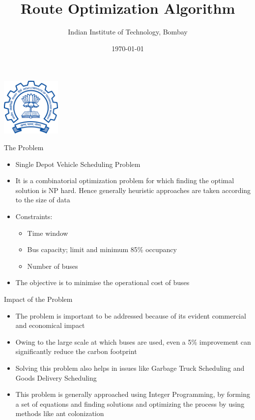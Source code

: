 \documentclass{beamer}
\title{Route Optimization Algorithm}
\author{Indian Institute of Technology, Bombay }
\date{\today}
\begin{document}
\begin{frame}
\begin{titlepage}
\begin{center}
    \includegraphics[width=2.9cm]{iitb.png}
\end{center}
\end{titlepage}
\end{frame}

\begin{frame}{The Problem}
\begin{itemize}
\item Single Depot Vehicle Scheduling Problem
\item It is a combinatorial optimization problem for which finding the optimal solution is NP hard. Hence generally heuristic approaches are taken according to the size of data
\item Constraints:
\begin{itemize}
    \item Time window
    \item Bus capacity; limit and minimum 85\% occupancy
    \item Number of buses
\end{itemize}
\item The objective is to minimise the operational cost of buses
\end{itemize}
\end{frame}

\begin{frame}{Impact of the Problem}
\begin{itemize}[<+- | alert@+>]
\item The problem is important to be addressed because of its evident commercial and economical impact
\item Owing to the large scale at which buses are used, even a 5\% improvement can significantly reduce the carbon footprint
\item Solving this problem also helps in issues like Garbage Truck Scheduling and Goods Delivery Scheduling
\item This problem is generally approached using Integer Programming, by forming a set of equations and finding solutions and optimizing the process by using methods like ant colonization
\end{itemize}
\end{frame}
\end{document}
